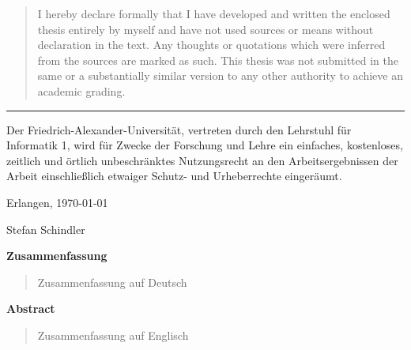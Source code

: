 \documentclass[10pt, a4paper, twoside]{scrartcl}
\renewcommand{\_}{\origunderscore\allowbreak}
\begin{document}
\begin{quote}
I hereby declare formally that I have developed and written the enclosed thesis
entirely by myself and have not used sources or means without declaration in
the text. Any thoughts or quotations which were inferred from the sources are
marked as such. This thesis was not submitted in the same or a substantially
similar version to any other authority to achieve an academic grading.
\end{quote}
\noindent\hrule

\vspace{0.5cm}
\noindent
Der Friedrich-Alexander-Universität, vertreten durch den Lehrstuhl
für Informatik 1, wird für Zwecke der Forschung und Lehre ein
einfaches, kostenloses, zeitlich und örtlich unbeschränktes
Nutzungsrecht an den Arbeitsergebnissen der Arbeit einschließlich
etwaiger Schutz- und Urheberrechte eingeräumt.

\vspace{0.5cm}
\noindent
Erlangen, \today

\vspace{1cm}
\begin{flushright}
Stefan Schindler \quad\null
\end{flushright}
\cleardoublepage

\vspace*{\fill}
\begin{center}
{\large\textbf{Zusammenfassung}}
\end{center}

\begin{quote}
Zusammenfassung auf Deutsch
\end{quote}

\vspace*{\fill}
\begin{center}
{\large\textbf{Abstract}}
\end{center}

\begin{quote}
Zusammenfassung auf Englisch
\end{quote}
\vspace*{\fill}
\cleardoublepage

\tableofcontents
\cleardoublepage

\listoffigures
\end{document}
